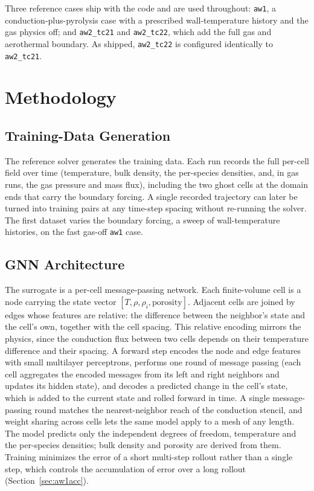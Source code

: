 \documentclass[conference]{IEEEtran}
\begin{document}
Three reference cases ship with the code and are used throughout: \texttt{aw1}, a
conduction-plus-pyrolysis case with a prescribed wall-temperature history and the
gas physics off; and \texttt{aw2\_tc21} and \texttt{aw2\_tc22}, which add the full
gas and aerothermal boundary. As shipped, \texttt{aw2\_tc22} is configured
identically to \texttt{aw2\_tc21}.

\section{Methodology}
\subsection{Training-Data Generation}
The reference solver generates the training data. Each run records the
full per-cell field over time (temperature, bulk density, the per-species
densities, and, in gas runs, the gas pressure and mass flux), including the two
ghost cells at the domain ends that carry the boundary forcing. A single recorded
trajectory can later be turned into training pairs at any time-step spacing without
re-running the solver. The first dataset varies the boundary forcing, a sweep of
wall-temperature histories, on the fast gas-off \texttt{aw1} case.

\subsection{GNN Architecture}
The surrogate is a per-cell message-passing network. Each finite-volume cell is a
node carrying the state vector $[T,\rho,\rho_i,\text{porosity}]$. Adjacent cells
are joined by edges whose features are relative: the difference between the
neighbor's state and the cell's own, together with the cell spacing. This relative
encoding mirrors the physics, since the conduction flux between two cells depends
on their temperature difference and their spacing. A forward step encodes the node
and edge features with small multilayer perceptrons, performs one round of message
passing (each cell aggregates the encoded messages from its left and right
neighbors and updates its hidden state), and decodes a predicted change in the
cell's state, which is added to the current state and rolled forward in time. A
single message-passing round matches the nearest-neighbor reach of the conduction
stencil, and weight sharing across cells lets the same model apply to a mesh of any
length. The model predicts only the independent degrees of freedom, temperature and
the per-species densities; bulk density and porosity are derived from them. Training
minimizes the error of a short multi-step rollout rather than a single step, which
controls the accumulation of error over a long rollout (Section~\ref{sec:aw1acc}).
\end{document}
